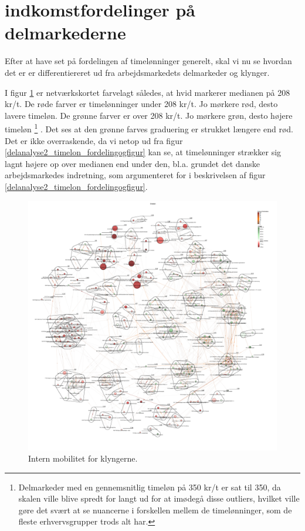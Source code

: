 %
\section{indkomstfordelinger på delmarkederne}
%

Efter at have set på fordelingen af timelønninger generelt, skal vi nu se hvordan det er er differentiereret ud fra arbejdsmarkedets delmarkeder og klynger.  

I figur \ref{fig_analyse_deskriptivt_kort_timelon} er netværkskortet farvelagt således, at hvid markerer medianen på 208 kr/t. De røde farver er timelønninger under 208 kr/t. Jo mørkere rød, desto lavere timeløn. De grønne farver er over 208 kr/t. Jo mørkere grøn, desto højere timeløn%
%
\footnote{ Delmarkeder med en gennemsnitlig timeløn på 350 kr/t er sat til 350, da skalen ville blive spredt for langt ud for at imødegå disse outliers, hvilket ville gøre det svært at se nuancerne i forskellen mellem de timelønninger, som de fleste erhvervsgrupper trods alt har.}%
%
. Det ses at den grønne farves graduering er strukket længere end rød. Det er ikke overraskende, da vi netop ud fra figur \ref{delanalyse2_timelon_fordelingogfigur} kan se, at timelønninger strækker sig lagnt højere op over medianen end under den, bl.a. grundet det danske arbejdsmarkedes indretning, som argumenteret for i beskrivelsen af figur \ref{delanalyse2_timelon_fordelingogfigur}.

%
\begin{figure}[H]
\begin{center}
  \caption{Intern mobilitet for klyngerne.}
  \label{fig_analyse_deskriptivt_kort_timelon}
  \includegraphics[width=1.0\textwidth]{fig/netvaerkskort/kort_timelon.pdf}
\end{center}
\end{figure}
\restoregeometry
%

